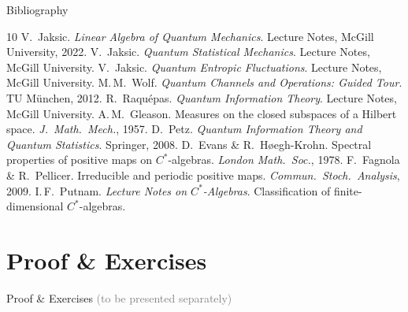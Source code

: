 \documentclass{beamer}
\begin{document}
\begin{frame}[shrink=10]{Bibliography}
  \footnotesize
  \begin{thebibliography}{10}
     V.\ Jaksic. \textit{Linear Algebra of Quantum Mechanics}. Lecture Notes, McGill University, 2022.
     V.\ Jaksic. \textit{Quantum Statistical Mechanics}. Lecture Notes, McGill University.
     V.\ Jaksic. \textit{Quantum Entropic Fluctuations}. Lecture Notes, McGill University.
     M.\,M.\ Wolf. \textit{Quantum Channels and Operations: Guided Tour}. TU M\"unchen, 2012.
     R.\ Raquépas. \textit{Quantum Information Theory}. Lecture Notes, McGill University.
     A.\,M.\ Gleason. Measures on the closed subspaces of a Hilbert space. \textit{J.\ Math.\ Mech.}, 1957.
     D.\ Petz. \textit{Quantum Information Theory and Quantum Statistics}. Springer, 2008.
     D.\ Evans \& R.\ H\o egh-Krohn. Spectral properties of positive maps on $C^*$-algebras. \textit{London Math.\ Soc.}, 1978.
     F.\ Fagnola \& R.\ Pellicer. Irreducible and periodic positive maps. \textit{Commun.\ Stoch.\ Analysis}, 2009.
     I.\,F.\ Putnam. \textit{Lecture Notes on $C^*$-Algebras}. Classification of finite-dimensional $C^*$-algebras.
  \end{thebibliography}
\end{frame}

\section{Proof \& Exercises}
\begin{frame}{Proof \& Exercises}
    \textcolor{gray}{(to be presented separately)}
\end{frame}
\end{document}
